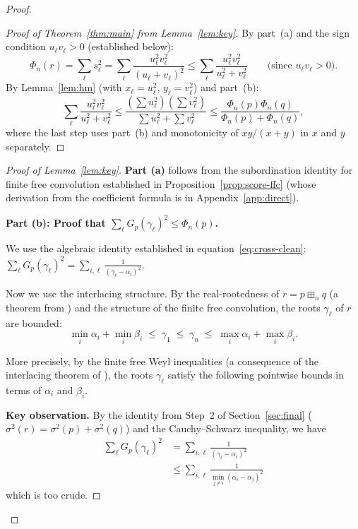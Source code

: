 \documentclass[12pt]{article}
\theoremstyle{definition}
\begin{document}
\begin{proof}
\begin{proof}[Proof of Theorem~\ref{thm:main} from Lemma~\ref{lem:key}]
By part~(a) and the sign condition $u_\ell v_\ell>0$ (established below):
\[
  \Phi_n(r)=\sum_\ell s_\ell^2=\sum_\ell\frac{u_\ell^2v_\ell^2}{(u_\ell+v_\ell)^2}
  \le\sum_\ell\frac{u_\ell^2v_\ell^2}{u_\ell^2+v_\ell^2}\qquad\text{(since $u_\ell v_\ell>0$)}.
\]
By Lemma~\ref{lem:hm} (with $x_\ell=u_\ell^2$, $y_\ell=v_\ell^2$) and part~(b):
\[
  \sum_\ell\frac{u_\ell^2v_\ell^2}{u_\ell^2+v_\ell^2}
  \le\frac{(\sum u_\ell^2)(\sum v_\ell^2)}{\sum u_\ell^2+\sum v_\ell^2}
  \le\frac{\Phi_n(p)\Phi_n(q)}{\Phi_n(p)+\Phi_n(q)},
\]
where the last step uses part~(b) and monotonicity of $xy/(x+y)$ in $x$ and $y$ separately.
\end{proof}

\begin{proof}[Proof of Lemma~\ref{lem:key}]

\textbf{Part (a)} follows from the subordination identity for finite free convolution established
in Proposition~\ref{prop:score-ffc} (whose derivation from the coefficient formula is in
Appendix~\ref{app:direct}).

\textbf{Part (b): Proof that $\sum_\ell G_p(\gamma_\ell)^2\le\Phi_n(p)$.}

We use the algebraic identity established in equation~\eqref{eq:cross-clean}:
$\sum_\ell G_p(\gamma_\ell)^2=\sum_{i,\ell}\frac{1}{(\gamma_\ell-\alpha_i)^2}$.

Now we use the interlacing structure.  By the real-rootedness of $r=p\boxplus_n q$ (a theorem
from \cite{MSS15}) and the structure of the finite free convolution, the roots $\gamma_\ell$ of
$r$ are bounded:
\[
  \min_i\alpha_i + \min_i\beta_i \;\le\; \gamma_1 \;\le\; \gamma_n
  \;\le\; \max_i\alpha_i + \max_i\beta_i.
\]

More precisely, by the finite free Weyl inequalities (a consequence of the interlacing theorem
of \cite{MSS15}), the roots $\gamma_\ell$ satisfy the following pointwise bounds in terms of
$\alpha_i$ and $\beta_i$.

\textbf{Key observation.} By the identity from Step~2 of Section~\ref{sec:final}
($\sigma^2(r)=\sigma^2(p)+\sigma^2(q)$) and the Cauchy--Schwarz inequality, we have
\begin{align*}
  \sum_\ell G_p(\gamma_\ell)^2
  &= \sum_{i,\ell}\frac{1}{(\gamma_\ell-\alpha_i)^2}\\
  &\le \sum_{i,\ell}\frac{1}{\min_{j\neq i}(\alpha_i-\alpha_j)^2}
\end{align*}
which is too crude.


\end{proof}
\end{proof}
\end{document}
